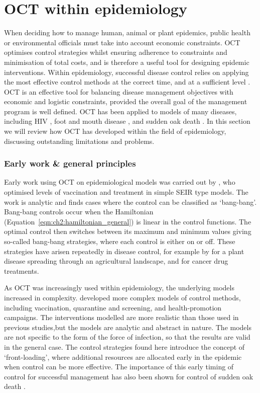 \section{OCT within epidemiology}\label{sec:ch2:oct_in_epidem}

When deciding how to manage human, animal or plant epidemics, public health or environmental officials must take into account economic constraints. OCT optimises control strategies whilst ensuring adherence to constraints and minimisation of total costs, and is therefore a useful tool for designing epidemic interventions. Within epidemiology, successful disease control relies on applying the most effective control methods at the correct time, and at a sufficient level \citationneeded. OCT is an effective tool for balancing disease management objectives with economic and logistic constraints, provided the overall goal of the management program is well defined. OCT has been applied to models of many diseases, including HIV \citationneeded, foot and mouth disease \citationneeded, and sudden oak death \citationneeded. In this section we will review how OCT has developed within the field of epidemiology, discussing outstanding limitations and problems.

\subsubsection{Early work \& general principles}

Early work using OCT on epidemiological models was carried out by \citet{sethi_optimal_1978}, who optimised levels of vaccination and treatment in simple SEIR type models. The work is analytic and finds cases where the control can be classified as `bang-bang'. Bang-bang controls occur when the Hamiltonian (Equation~\ref{eqn:ch2:hamiltonian_general}) is linear in the control functions. The optimal control then switches between its maximum and minimum values giving so-called bang-bang strategies, where each control is either on or off. These strategies have arisen repeatedly in disease control, for example by \citet{forster_optimizing_2007} for a plant disease spreading through an agricultural landscape, and \citet{panetta_optimal_2003} for cancer drug treatments.

As OCT was increasingly used within epidemiology, the underlying models increased in complexity. \citet{behncke_optimal_2000} developed more complex models of control methods, including vaccination, quarantine and screening, and health-promotion campaigns. The interventions modelled are more realistic than those used in previous studies,but the models are analytic and abstract in nature. The models are not specific to the form of the force of infection, so that the results are valid in the general case. The control strategies found here introduce the concept of `front-loading', where additional resources are allocated early in the epidemic when control can be more effective. The importance of this early timing of control for successful management has also been shown for control of sudden oak death \citep{cunniffe_modelling_2016}.

